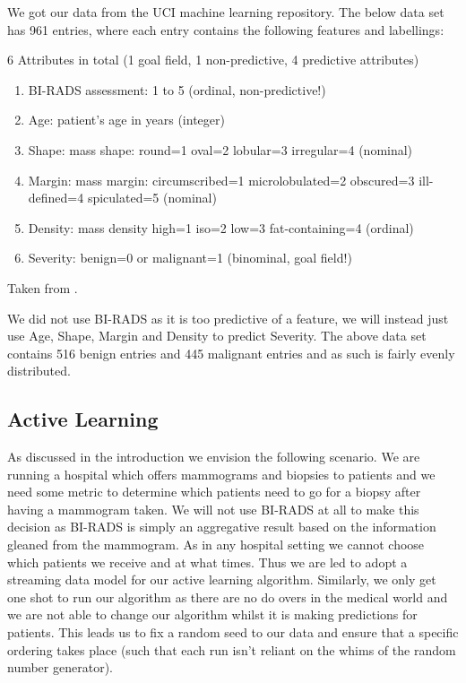 \documentclass[12pt]{article}
\begin{document}
We got our data from the UCI machine learning repository. The below data set has 961 entries, where each entry contains the following features and labellings: 

6 Attributes in total (1 goal field, 1 non-predictive, 4 predictive attributes) 
\begin{enumerate}
\item BI-RADS assessment: 1 to 5 (ordinal, non-predictive!) 
\item Age: patient's age in years (integer) 
\item Shape: mass shape: round=1 oval=2 lobular=3 irregular=4 (nominal) 
\item Margin: mass margin: circumscribed=1 microlobulated=2 obscured=3 ill-defined=4 spiculated=5 (nominal) 
\item Density: mass density high=1 iso=2 low=3 fat-containing=4 (ordinal) 
\item Severity: benign=0 or malignant=1 (binominal, goal field!) 
\end{enumerate}

Taken from \cite{dataset}.

We did not use BI-RADS as it is too predictive of a feature, we will instead just use Age, Shape, Margin and Density to predict Severity. The above data set contains 516 benign entries and 445 malignant entries and as such is fairly evenly distributed.

\subsection{Active Learning}
As discussed in the introduction we envision the following scenario. We are running a hospital which offers mammograms and biopsies to patients and we need some metric to determine which patients need to go for a biopsy after having a mammogram taken. We will not use BI-RADS at all to make this decision as BI-RADS is simply an aggregative result based on the information gleaned from the mammogram. As in any hospital setting we cannot choose which patients we receive and at what times. Thus we are led to adopt a streaming data model for our active learning algorithm. Similarly, we only get one shot to run our algorithm as there are no do overs in the medical world and we are not able to change our algorithm whilst it is making predictions for patients. This leads us to fix a random seed to our data and ensure that a specific ordering takes place (such that each run isn't reliant on the whims of the random number generator).
\end{document}
